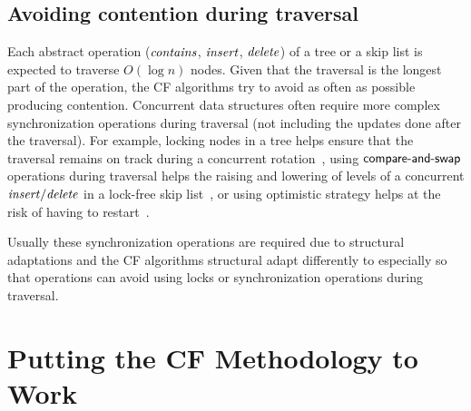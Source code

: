 
\subsection{Avoiding contention during traversal}
Each abstract operation ($\ms{contains}$, $\ms{insert}$, $\ms{delete}$) of a tree or a skip list is %
expected to traverse $O(\log{n})$ nodes.
Given that the traversal is the longest part of the operation, the CF algorithms try to avoid as often as possible producing contention.
%
Concurrent data structures often require more complex synchronization operations during traversal (not including the updates done after the traversal).
For example, locking nodes in a tree helps ensure that the traversal remains on track during a concurrent rotation~\cite{BCCO10}, using $\lit{compare-and-swap}$ operations during traversal helps the raising and lowering of levels of a concurrent $\ms{insert/delete}$ in a lock-free skip list~\cite{Fra03}, or using optimistic strategy helps at the risk of having to restart~\cite{HLL07,HS08}.

Usually these synchronization operations are required due to structural adaptations and the CF 
algorithms structural adapt differently to especially so that operations can avoid using
locks or synchronization operations during traversal.
%

\section{Putting the CF Methodology to Work}\label{sec:datastruct}

